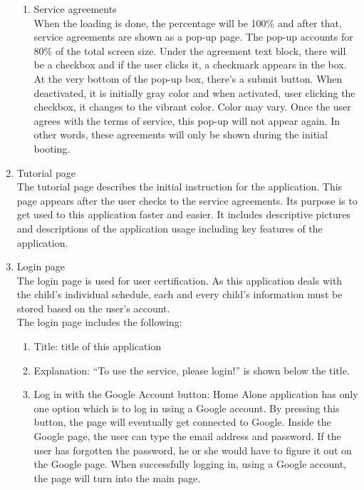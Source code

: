 \documentclass[conference]{IEEEtran}
\begin{document}
\begin{enumerate}[label=\arabic*.]
\begin{enumerate}[label=\alph*.]
        \item {\large{Service agreements}} \\
        When the loading is done, the percentage will be 100\% and after that, service agreements are shown as a pop-up page. The pop-up accounts for 80\% of the total screen size. Under the agreement text block, there will be a checkbox and if the user clicks it, a checkmark appears in the box. At the very bottom of the pop-up box, there’s a submit button. When deactivated, it is initially gray color and when activated, user clicking the checkbox, it changes to the vibrant color. Color may vary. Once the user agrees with the terms of service, this pop-up will not appear again. In other words, these agreements will only be shown during the initial booting. \\
    \end{enumerate}
    \item {\large{Tutorial page}} \\
    The tutorial page describes the initial instruction for the application. This page appears after the user checks to the service agreements. Its purpose is to get used to this application faster and easier. It includes descriptive pictures and descriptions of the application usage including key features of the application. \\
    \item {\large{Login page}} \\   
    The login page is used for user certification. As this application deals with the child’s individual schedule, each and every child’s information must be stored based on the user’s account. \\      
    The login page includes the following: \\
    \begin{enumerate}[label=\alph*.]
        \item {\large{Title: title of this application}} \\
        \item {\large{Explanation: “To use the service, please login!” is shown below the title. }} \\
        \item {\large{Log in with the Google Account button: Home Alone application has only one option which is to log in using a Google account. By pressing this button, the page will eventually get connected to Google. Inside the Google page, the user can type the email address and password. If the user has forgotten the password, he or she would have to figure it out on the Google page. When successfully logging in, using a Google account, the page will turn into the main page. }} \\

\end{enumerate}
\end{enumerate}
\end{document}
